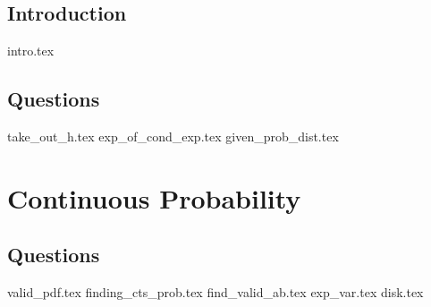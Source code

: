 \documentclass{exam}
\begin{document}
\subsection{Introduction}
{intro.tex}
\subsection{Questions}
\begin{questions}
	{take_out_h.tex}
	{exp_of_cond_exp.tex}
	{given_prob_dist.tex}
\end{questions}

\section{Continuous Probability}               

\subsection{Questions}                                                                                                                                                      
\begin{questions}                                                                                                                                                           
	{valid_pdf.tex}                                                                                                    
	{finding_cts_prob.tex}                                                                                             
	{find_valid_ab.tex}                                                                                                {exp_var.tex}                                                                                                      
	{disk.tex}
\end{questions}
\end{document}
